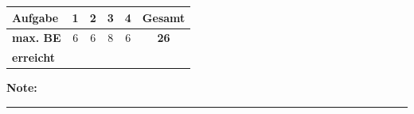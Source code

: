 \documentclass[11pt, a4paper]{article}
\newcommand{\luecke}[1]{\rule{#1}{0.4pt}}
\begin{document}
\noindent
\begin{tabularx}{\textwidth}{|X|c|c|c|c||c|}
\hline
\textbf{Aufgabe} & 1 & 2 & 3 & 4 & \textbf{Gesamt} \\
\hline
\textbf{max. BE} & 6 & 6 & 8 & 6 & \textbf{26} \\
\hline
\textbf{erreicht} & & & & & \\[0.8em]
\hline
\end{tabularx}

\vspace{10pt}

\begin{flushright}
\textbf{Note:} \luecke{2cm}
\end{flushright}
\end{document}
